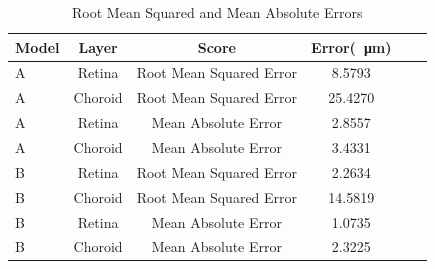 \documentclass[12pt,a4paper]{scrartcl}
\begin{document}
\begin{table}[H]
    \begin{tabular}{l c|c|c|c|c}
         \textbf{Model} &\textbf{Layer} & \textbf{Score}& \textbf{Error(\SI{}{\micro\metre})}  \\
         \hline
         A & Retina & Root Mean Squared Error &  8.5793 \\
         A & Choroid & Root Mean Squared Error & 25.4270 \\
         A & Retina & Mean Absolute Error & 2.8557 \\
         A & Choroid & Mean Absolute Error & 3.4331 \\
         B & Retina & Root Mean Squared Error & 2.2634 \\
         B & Choroid & Root Mean Squared Error & 14.5819 \\
         B & Retina & Mean Absolute Error & 1.0735 \\
         B & Choroid & Mean Absolute Error & 2.3225 \\
    \end{tabular}
    \caption{Root Mean Squared and Mean Absolute Errors}
    \label{tab:Error_Scores}
\end{table}
\end{document}
